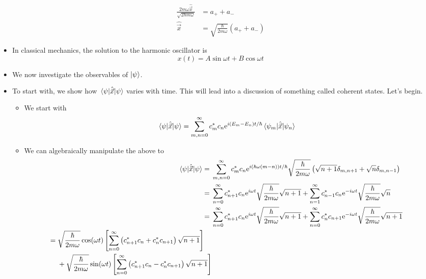 \documentclass[../notes.tex]{subfiles}
\begin{document}
\begin{itemize}
    \begin{align*}
        \frac{2m\omega\hat{\vec{x}}}{\sqrt{2\hbar m\omega}} &= a_++a_-\\
        \hat{\vec{x}} &= \sqrt{\frac{\hbar}{2m\omega}}(a_++a_-)
    \end{align*}
    \item In classical mechanics, the solution to the harmonic oscillator is
    \begin{equation*}
        x(t) = A\sin\omega t+B\cos\omega t
    \end{equation*}
    \item We now investigate the observables of $\ket{\psi}$.
    \item To start with, we show how $\ev{\hat{\vec{x}}}{\psi}$ varies with time. This will lead into a discussion of something called coherent states. Let's begin.
    \begin{itemize}
        \item We start with
        \begin{equation*}
            \ev{\hat{\vec{x}}}{\psi} = \sum_{m,n=0}^\infty c_m^*c_n\e[i(E_m-E_n)t/\hbar]\mel{\psi_m}{\hat{\vec{x}}}{\psi_n}
        \end{equation*}
        \item We can algebraically manipulate the above to
        \begin{align*}
            \ev{\hat{\vec{x}}}{\psi} ={}& \sum_{m,n=0}^\infty c_m^*c_n\e[i(\hbar\omega(m-n))t/\hbar]\sqrt{\frac{\hbar}{2m\omega}}\left( \sqrt{n+1}\delta_{m,n+1}+\sqrt{n}\delta_{m,n-1} \right)\\
            ={}& \sum_{n=0}^\infty c_{n+1}^*c_n\e[i\omega t]\sqrt{\frac{\hbar}{2m\omega}}\sqrt{n+1}+\sum_{n=1}^\infty c_{n-1}^*c_n\e[-i\omega t]\sqrt{\frac{\hbar}{2m\omega}}\sqrt{n}\\
            ={}& \sum_{n=0}^\infty c_{n+1}^*c_n\e[i\omega t]\sqrt{\frac{\hbar}{2m\omega}}\sqrt{n+1}+\sum_{n=0}^\infty c_n^*c_{n+1}\e[-i\omega t]\sqrt{\frac{\hbar}{2m\omega}}\sqrt{n+1}\\
            \begin{split}
                ={}& \sqrt{\frac{\hbar}{2m\omega}}\cos(\omega t)\left[ \sum_{n=0}^\infty\left( c_{n+1}^*c_n+c_n^*c_{n+1} \right)\sqrt{n+1} \right]\\
                & +\sqrt{\frac{\hbar}{2m\omega}}\sin(\omega t)\left[ \sum_{n=0}^\infty\left( c_{n+1}^*c_n-c_n^*c_{n+1} \right)\sqrt{n+1} \right]
            \end{split}
        \end{align*}

\end{itemize}
\end{itemize}
\end{document}
